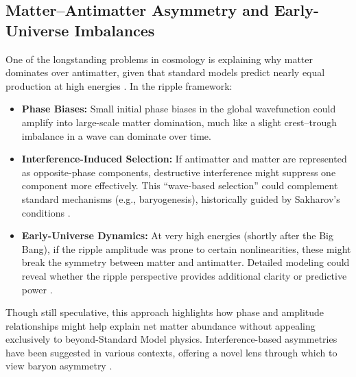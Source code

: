 \documentclass{article}
\begin{document}
\subsection{Matter--Antimatter Asymmetry and Early-Universe Imbalances}
\label{subsec:matter-antimatter-imbalance}
One of the longstanding problems in cosmology is explaining why matter 
dominates over antimatter, given that standard models predict nearly 
equal production at high energies \cite{kolbTurner1990, griffiths2005}. 
In the ripple framework:
\begin{itemize}
  \item \textbf{Phase Biases:} Small initial phase biases in the global 
        wavefunction could amplify into large-scale matter domination, 
        much like a slight crest--trough imbalance in a wave can dominate 
        over time.
  \item \textbf{Interference-Induced Selection:} If antimatter and matter 
        are represented as opposite-phase components, destructive interference 
        might suppress one component more effectively. This “wave-based 
        selection” could complement standard mechanisms (e.g., baryogenesis), 
        historically guided by Sakharov’s conditions \cite{Sakharov1967}.
  \item \textbf{Early-Universe Dynamics:} At very high energies (shortly 
        after the Big Bang), if the ripple amplitude was prone to certain 
        nonlinearities, these might break the symmetry between matter 
        and antimatter. Detailed modeling could reveal whether the ripple 
        perspective provides additional clarity or predictive power 
        \cite{penrose2004, susskind2008}.
\end{itemize}
Though still speculative, this approach highlights how phase and amplitude 
relationships might help explain net matter abundance without appealing 
exclusively to beyond-Standard Model physics. Interference-based asymmetries 
have been suggested in various contexts, offering a novel lens through which 
to view baryon asymmetry \cite{kolbTurner1990}.
\end{document}
